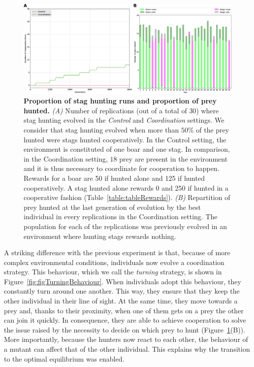     \begin{figure}[h]
      \centering
        \includegraphics[width=1\linewidth]{fig/ArticleBio2/Fig2.png}
        \caption{\textbf{Proportion of stag hunting runs and proportion of prey hunted.}
        \emph{(A)} Number of replications (out of a total of $30$) where stag hunting evolved in the \emph{Control} and \emph{Coordination} settings. We consider that stag hunting evolved when more than $50\%$ of the prey hunted were stags hunted cooperatively. In the Control setting, the environment is constituted of one boar and one stag. In comparison, in the Coordination setting, $18$ prey are present in the environment and it is thus necessary to coordinate for cooperation to happen. Rewards for a boar are 50 if hunted alone and 125 if hunted cooperatively. A stag hunted alone rewards 0 and 250 if hunted in a cooperative fashion (Table~\ref{table:tableRewards}). \emph{(B)} Repartition of prey hunted at the last generation of evolution by the best individual in every replications in the Coordination setting. The population for each of the replications was previously evolved in an environment where hunting stags rewards nothing.}
      \label{fig:figRecycling}
    \end{figure}

    A striking difference with the previous experiment is that, because of more complex environmental conditions, individuals now evolve a coordination strategy. This behaviour, which we call the \emph{turning} strategy, is shown in Figure~\ref{fig:figTurningBehaviour}. When individuals adopt this behaviour, they constantly turn around one another. This way, they ensure that they keep the other individual in their line of sight. At the same time, they move towards a prey and, thanks to their proximity, when one of them gets on a prey the other can join it quickly. In consequence, they are able to achieve cooperation to solve the issue raised by the necessity to decide on which prey to hunt (Figure~\ref{fig:figRecycling}(B)). More importantly, because the hunters now react to each other, the behaviour of a mutant can affect that of the other individual. This explains why the transition to the optimal equilibrium was enabled.

